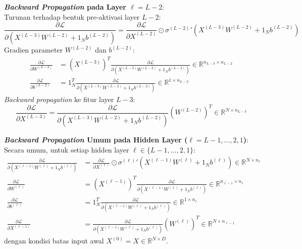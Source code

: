 \documentclass[11pt,a4paper]{article}
\def\mathbf#1{#1}%
\theoremstyle{plain}
\theoremstyle{definition}
\theoremstyle{remark}
\begin{document}
\noindent \textbf{\textit{Backward Propagation} pada Layer $\ell = L-2$}: \\
Turunan terhadap bentuk pre-aktivasi layer $L-2$:
\begin{equation}
    \frac{\partial \mathcal{L}}{\partial \left( X^{(L-3)} W^{(L-2)} + \mathbf{1}_N \mathbf{b}^{(L-2)} \right)} = \frac{\partial \mathcal{L}}{\partial X^{(L-2)}} \odot {\sigma^{(L-2)}}'\left( X^{(L-3)} W^{(L-2)} + \mathbf{1}_N \mathbf{b}^{(L-2)} \right)
\end{equation}
Gradien parameter $W^{(L-2)}$ dan $\mathbf{b}^{(L-2)}$:
\begin{align}
    \frac{\partial \mathcal{L}}{\partial W^{(L-2)}} &= \left( X^{(L-3)} \right)^T \frac{\partial \mathcal{L}}{\partial \left( X^{(L-3)} W^{(L-2)} + \mathbf{1}_N \mathbf{b}^{(L-2)} \right)} \in \mathbb{R}^{n_{L-3} \times n_{L-2}} \\[0.3em]
    \frac{\partial \mathcal{L}}{\partial \mathbf{b}^{(L-2)}} &= \mathbf{1}_N^T \frac{\partial \mathcal{L}}{\partial \left( X^{(L-3)} W^{(L-2)} + \mathbf{1}_N \mathbf{b}^{(L-2)} \right)} \in \mathbb{R}^{1 \times n_{L-2}}
\end{align}
\textit{Backward propagation} ke fitur layer $L-3$:
\begin{equation}
    \frac{\partial \mathcal{L}}{\partial X^{(L-3)}} = \frac{\partial \mathcal{L}}{\partial \left( X^{(L-3)} W^{(L-2)} + \mathbf{1}_N \mathbf{b}^{(L-2)} \right)} \left( W^{(L-2)} \right)^T \in \mathbb{R}^{N \times n_{L-3}}
\end{equation}

\noindent \textbf{\textit{Backward Propagation} Umum pada Hidden Layer ($\ell = L-1, \dots, 2, 1$)}: \\
Secara umum, untuk setiap hidden layer $\ell \in \{L-1, \dots, 2, 1\}$:
\begin{align}
    \frac{\partial \mathcal{L}}{\partial \left( X^{(\ell-1)} W^{(\ell)} + \mathbf{1}_N \mathbf{b}^{(\ell)} \right)} &= \frac{\partial \mathcal{L}}{\partial X^{(\ell)}} \odot {\sigma^{(\ell)}}'\left( X^{(\ell-1)} W^{(\ell)} + \mathbf{1}_N \mathbf{b}^{(\ell)} \right) \in \mathbb{R}^{N \times n_\ell} \label{eq:batch_dL_hidden} \\[0.3em]
    \frac{\partial \mathcal{L}}{\partial W^{(\ell)}} &= \left( X^{(\ell-1)} \right)^T \frac{\partial \mathcal{L}}{\partial \left( X^{(\ell-1)} W^{(\ell)} + \mathbf{1}_N \mathbf{b}^{(\ell)} \right)} \in \mathbb{R}^{n_{\ell-1} \times n_\ell} \label{eq:batch_grad_w_hidden} \\[0.3em]
    \frac{\partial \mathcal{L}}{\partial \mathbf{b}^{(\ell)}} &= \mathbf{1}_N^T \frac{\partial \mathcal{L}}{\partial \left( X^{(\ell-1)} W^{(\ell)} + \mathbf{1}_N \mathbf{b}^{(\ell)} \right)} \in \mathbb{R}^{1 \times n_\ell} \label{eq:batch_grad_b_hidden} \\[0.3em]
    \frac{\partial \mathcal{L}}{\partial X^{(\ell-1)}} &= \frac{\partial \mathcal{L}}{\partial \left( X^{(\ell-1)} W^{(\ell)} + \mathbf{1}_N \mathbf{b}^{(\ell)} \right)} \left( W^{(\ell)} \right)^T \in \mathbb{R}^{N \times n_{\ell-1}} \label{eq:batch_dL_dXprev}
\end{align}
dengan kondisi batas input awal $X^{(0)} = X \in \mathbb{R}^{N \times D}$.
\end{document}
